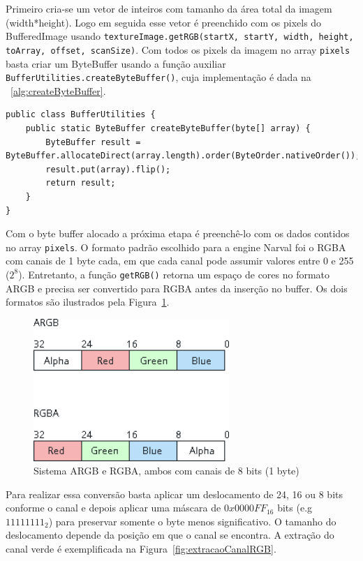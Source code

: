\documentclass[12pt, 
openright, 
oneside, 
a4paper,    
brazil]{facom-ufu-abntex2}
\begin{document}
Primeiro cria-se um vetor de inteiros com tamanho da área total da imagem (width*height). Logo em seguida esse vetor é preenchido com os pixels do BufferedImage usando \texttt{textureImage.getRGB(startX, startY, width, height, toArray, offset, scanSize)}. Com todos os pixels da imagem no array \texttt{pixels} basta criar um ByteBuffer usando a função auxiliar \texttt{BufferUtilities.createByteBuffer()}, cuja implementação é dada na \lstlistingname~\ref{alg:createByteBuffer}.

\begin{lstlisting}[caption=Função auxiliar createByteBuffer, label={alg:createByteBuffer}
]
public class BufferUtilities {
	public static ByteBuffer createByteBuffer(byte[] array) {
		ByteBuffer result = ByteBuffer.allocateDirect(array.length).order(ByteOrder.nativeOrder());
		result.put(array).flip();
		return result;
	} 
}
\end{lstlisting}

Com o byte buffer alocado a próxima etapa é preenchê-lo com os dados contidos no array \texttt{pixels}. O formato padrão escolhido para a engine Narval foi o RGBA com canais de 1 byte cada, em que cada canal pode assumir valores entre 0 e 255 ($2^8$). Entretanto, a função \texttt{getRGB()} retorna um espaço de cores no formato ARGB e precisa ser convertido para RGBA antes da inserção no buffer. Os dois formatos são ilustrados pela Figura~\ref{fig:ARGBeRGBA}.

\begin{figure}[H]
	\centering
	\includegraphics[width=20em]{imagens/sistema_rgba_argb.png}
	\caption{Sistema ARGB e RGBA, ambos com canais de 8 bits (1 byte)}
	\label{fig:ARGBeRGBA}
\end{figure}

Para realizar essa conversão basta aplicar um deslocamento de 24, 16 ou 8 bits conforme o canal e depois aplicar uma máscara de $0x0000FF_{16}$ bits (e.g $11111111_2$) para preservar somente o byte menos significativo. O tamanho do deslocamento depende da posição em que o canal se encontra. A extração do canal verde é exemplificada na Figura~\ref{fig:extracaoCanalRGB}.
\end{document}
